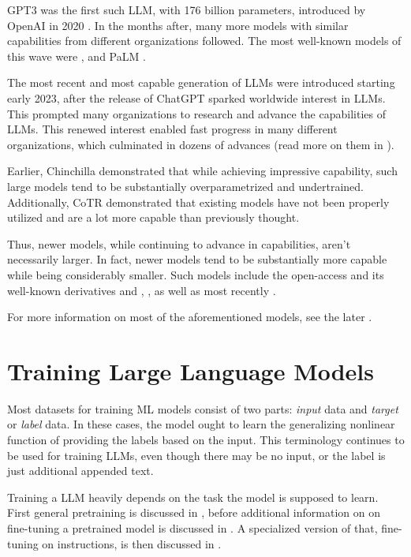 \gls{GPT3} was the first such \gls{LLM}, with 176 billion parameters, introduced by \gls{OpenAI} in 2020 \cite{brown_language_2020}.
In the months after, many more models with similar capabilities from different organizations followed.
The most well-known models of this wave were ,  and \gls{PaLM} \cite{chowdhery_palm_2022}.


The most recent and most capable generation of \glspl{LLM} were introduced starting early 2023, after the release of \gls{ChatGPT} sparked worldwide interest in \glspl{LLM}.
This prompted many organizations to research and advance the capabilities of \glspl{LLM}.
This renewed interest enabled fast progress in many different organizations, which culminated in dozens of advances (read more on them in ).

Earlier, Chinchilla \cite{hoffmann_training_2022} demonstrated that while achieving impressive capability, such large models tend to be substantially overparametrized and undertrained.
Additionally, CoTR \cite{zhang_multimodal_2023} demonstrated that existing models have not been properly utilized and are a lot more capable than previously thought.

Thus, newer models, while continuing to advance in capabilities, aren't necessarily larger.
In fact, newer models tend to be substantially more capable while being considerably smaller.
Such models include the open-access  and its well-known derivatives  and , , as well as most recently .

For more information on most of the aforementioned models, see the later .



\section{Training Large Language Models}\label{sec:training}
Most datasets for training \gls{ML} models consist of two parts: \textit{input} data and \textit{target} or \textit{label} data.
In these cases, the model ought to learn the generalizing nonlinear function of providing the labels based on the input.
This terminology continues to be used for training \glspl{LLM}, even though there may be no input, or the label is just additional appended text.

Training a \acrlong{LLM} heavily depends on the task the model is supposed to learn.
First general pretraining is discussed in , before additional information on on fine-tuning a pretrained model is discussed in .
A specialized version of that, fine-tuning on instructions, is then discussed in .


